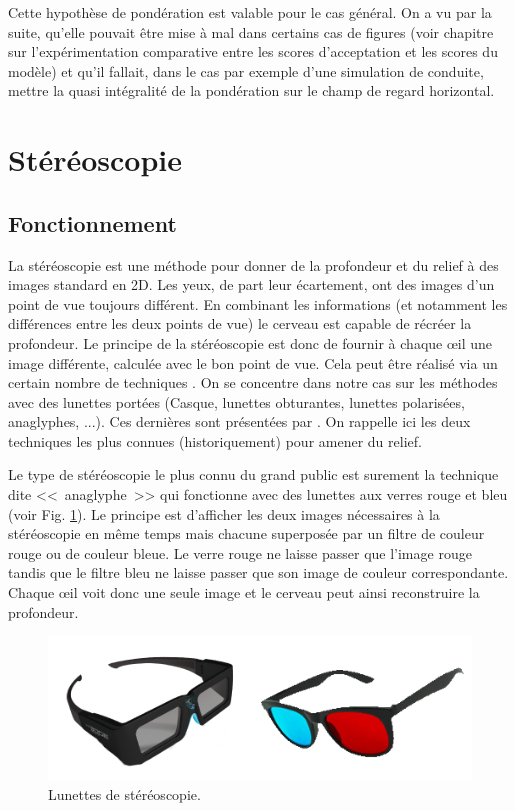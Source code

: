	\par Cette hypothèse de pondération est valable pour le cas général. On a vu par la suite, qu'elle pouvait être mise à mal dans certains cas de figures (voir chapitre sur l'expérimentation comparative entre les scores d'acceptation et les scores du modèle) et qu'il fallait, dans le cas par exemple d'une simulation de conduite, mettre la quasi intégralité de la pondération sur le champ de regard horizontal.
	
	\section{Stéréoscopie}
	\subsection{Fonctionnement}	
	\par La stéréoscopie est une méthode pour donner de la profondeur et du relief à des images  standard en 2D. Les yeux, de part leur écartement, ont des images d'un point de vue toujours différent. En combinant les informations (et notamment les différences entre les deux points de vue) le cerveau est capable de récréer la profondeur. Le principe de la stéréoscopie est donc de fournir à chaque œil une image différente, calculée avec le bon point de vue. Cela peut être réalisé via un certain nombre de techniques \citep{mehrabi_making_2013}. On se concentre dans notre cas sur les méthodes avec des lunettes portées (Casque, lunettes obturantes, lunettes polarisées, anaglyphes, ...). Ces dernières sont présentées par \cite{fauster_stereoscopic_2007}. On rappelle ici les deux techniques les plus connues (historiquement) pour amener du relief.
	
	\par Le type de stéréoscopie le plus connu du grand public est surement la technique dite <<~anaglyphe~>> qui fonctionne avec des lunettes aux verres rouge et bleu (voir Fig. \ref{fig:stereo_glasses}). Le principe est d'afficher les deux images nécessaires à la stéréoscopie en même temps mais chacune superposée par un filtre de couleur rouge ou de couleur bleue. Le verre rouge ne laisse passer que l'image rouge tandis que le filtre bleu ne laisse passer que son image de couleur correspondante. Chaque œil voit donc une seule image et le cerveau peut ainsi reconstruire la profondeur.
	
	\begin{figure}[h]
		\centering
		\includegraphics[scale=.8]{Figures/StereoActiveAnaglyphGlasses}
		\caption{Lunettes de stéréoscopie.}
		\label{fig:stereo_glasses}
	\end{figure}
	
